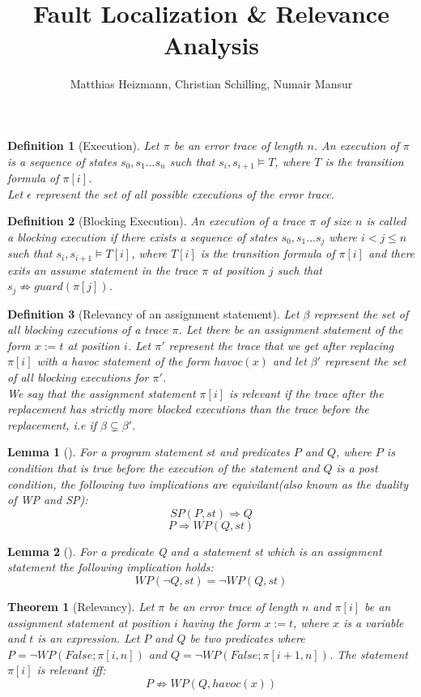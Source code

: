 \documentclass{article}
\title{Fault Localization \& Relevance Analysis \\ }
\author{Matthias Heizmann, Christian Schilling, Numair Mansur}
\newcommand{\limp}{\Rightarrow}
\newtheorem{mydef}{Definition}
\newtheorem{theorem}{Theorem}
\newtheorem{lemma}{Lemma}
\begin{document}
\maketitle

\begin{mydef}[Execution]\label{mydef:execution}
Let $\pi$ be an error trace of length $n$. An execution of $\pi$ is a sequence of states $s_0, s_1...s_n$ such that $s_i, s_{i+1} \models T$, where $T$ is the transition formula of $\pi[i]$. \\
Let $\epsilon$ represent the set of all possible executions of the error trace.
\end{mydef}

\begin{mydef}[Blocking Execution]\label{mydef:blockingexecution}
An execution of a trace $\pi$ of size $n$ is called a blocking execution if there exists a sequence of states $s_0, s_1...s_j$ where $i<j \leq n$ such that $s_i, s_{i+1} \models T[i]$, where $T[i]$ is the transition formula of $\pi[i]$ and there exits an assume statement in the trace $\pi$ at position $j$ such that $s_{j} \not \limp guard(\pi[j])$.
\end{mydef}

\begin{mydef}[Relevancy of an assignment statement]\label{mydef:relevancy}
Let $\beta$ represent the set of all blocking executions of a trace $\pi$. Let there be an assignment statement of the form $x:=t$ at position $i$. Let $\pi'$ represent the trace that we get after replacing $\pi[i]$ with a havoc statement of the form $havoc(x)$ and let $\beta'$ represent the set of all blocking executions for $\pi'$.\\
We say that the assignment statement $\pi[i]$ is relevant if the trace after the replacement has strictly more blocked executions than the trace before the replacement, i.e if $\beta \subsetneq \beta'$. 
\end{mydef}

\begin{lemma}[]\label{lemma:duality}
For a program statement $st$ and predicates $P$ and $Q$, where $P$ is condition that is true before the execution of the statement and $Q$ is a post condition, the following two implications are equivilant(also known as the duality of WP and SP):
$$SP(P,st) \Rightarrow Q$$
$$P \Rightarrow WP(Q,st)$$
\end{lemma}
\begin{lemma}[]\label{lemma:neg_wp_assignment}
For a predicate Q and a statement st which is an assignment statement the following implication holds:\\
$$WP(\neg Q,st) = \neg WP(Q,st)$$
\end{lemma}
\newpage
\begin{theorem}[Relevancy]\label{mydef:relevancytheorem}
Let $\pi$ be an error trace of length $n$ and $\pi[i]$ be an assignment statement at position $i$ having the form $x:=t$, where $x$ is a variable and $t$ is an expression. Let $P$ and $Q$ be two predicates where $P = \neg WP(False; \pi[i,n])$ and $Q =  \neg WP(False; \pi[i+1,n])$. The statement $\pi[i]$ is relevant iff:
 $$P \not \limp WP(Q,havoc(x))$$
\end{theorem}
\end{document}
